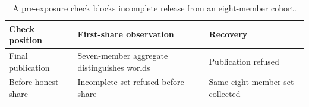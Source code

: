 \begin{table}[t]
\centering
\caption{A pre-exposure check blocks incomplete release from an eight-member cohort.}
\label{tab:gate-position-contrast}
\footnotesize
\begin{tabularx}{\columnwidth}{@{}lYY@{}}
\toprule
Check position & First-share observation & Recovery \\
\midrule
Final publication & Seven-member aggregate distinguishes worlds & Publication refused \\
Before honest share & Incomplete set refused before share & Same eight-member set collected \\
\bottomrule
\end{tabularx}
\end{table}

